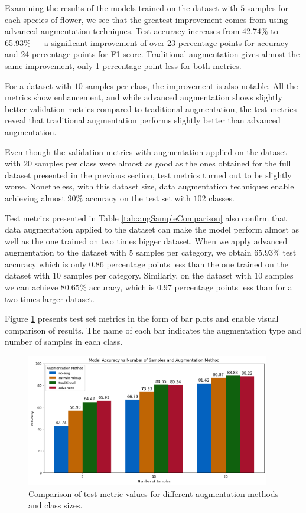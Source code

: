 Examining the results of the models trained on the dataset with $5$ samples for each species of flower, we see that the greatest improvement comes from using advanced augmentation techniques. Test accuracy increases from 42.74\% to 65.93\% — a significant improvement of over 23 percentage points for accuracy and 24 percentage points for F1 score. Traditional augmentation gives almost the same improvement, only 1 percentage point less for both metrics. 

For a dataset with $10$ samples per class, the improvement is also notable. All the metrics show enhancement, and while advanced augmentation shows slightly better validation metrics compared to traditional augmentation, the test metrics reveal that traditional augmentation performs slightly better than advanced augmentation.

Even though the validation metrics with augmentation applied on the dataset with $20$ samples per class were almost as good as the ones obtained for the full dataset presented in the previous section, test metrics turned out to be slightly worse. Nonetheless, with this dataset size, data augmentation techniques enable achieving almost 90\% accuracy on the test set with $102$ classes.

Test metrics presented in Table \ref{tab:augSampleComparison} also confirm that data augmentation applied to the dataset can make the model perform almost as well as the one trained on two times bigger dataset. When we apply advanced augmentation to the dataset with $5$ samples per category, we obtain $65.93\%$ test accuracy which is only $0.86$ percentage points less than the one trained on the dataset with 10 samples per category. Similarly, on the dataset with $10$ samples we can achieve $80.65\%$ accuracy, which is $0.97$ percentage points less than for a two times larger dataset.

Figure \ref{fig:testMetricsOneshot} presents test set metrics in the form of bar plots and enable visual comparison of results. The name of each bar indicates the augmentation type and number of samples in each class.

\begin{figure}[!h]
    \centering
    \includegraphics[width=0.95\textwidth]{Images/oneshot/oneshot_test_bar_plot.png}
    \caption{Comparison of test metric values for different augmentation methods and class sizes.}
    \label{fig:testMetricsOneshot}
\end{figure}

